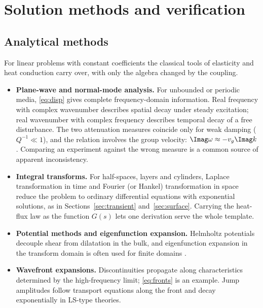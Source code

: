 \section{Solution methods and verification}\label{sec:methods}
\subsection{Analytical methods}
For linear problems with constant coefficients the classical tools of elasticity and heat conduction carry over, with only the algebra changed by the coupling.
\begin{itemize}
\item \textbf{Plane-wave and normal-mode analysis.} For unbounded or periodic media, \eqref{eq:disp} gives complete frequency-domain information. Real frequency with complex wavenumber describes spatial decay under steady excitation; real wavenumber with complex frequency describes temporal decay of a free disturbance. The two attenuation measures coincide only for weak damping ($Q^{-1}\ll1$), and the relation involves the group velocity: $\Imag\omega\approx-v_g\Imag k$. Comparing an experiment against the wrong measure is a common source of apparent inconsistency.
\item \textbf{Integral transforms.} For half-spaces, layers and cylinders, Laplace transformation in time and Fourier (or Hankel) transformation in space reduce the problem to ordinary differential equations with exponential solutions, as in Sections~\ref{sec:transient} and~\ref{sec:surface}. Carrying the heat-flux law as the function $G(s)$ lets one derivation serve the whole template.
\item \textbf{Potential methods and eigenfunction expansion.} Helmholtz potentials decouple shear from dilatation in the bulk, and eigenfunction expansion in the transform domain is often used for finite domains \citep{Singh2020a}.
\item \textbf{Wavefront expansions.} Discontinuities propagate along characteristics determined by the high-frequency limit; \eqref{eq:fronts} is an example. Jump amplitudes follow transport equations along the front and decay exponentially in LS-type theories.
\end{itemize}

